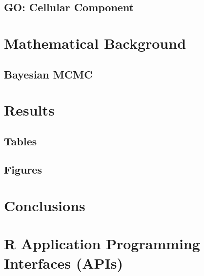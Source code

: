 \subsection{GO: Cellular Component}

\section{Mathematical Background}

\subsection{Bayesian MCMC}


\section{Results}

\subsection{Tables}

\subsection{Figures}


\section{Conclusions}


\section{R Application Programming Interfaces (APIs)}


